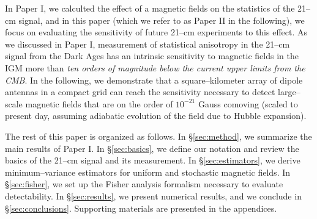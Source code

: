 In Paper I, we calculted the effect of a magnetic fields on the statistics of the 21--cm signal, and in this paper (which we refer to as Paper II in the following), we focus on evaluating the sensitivity of future 21--cm experiments to this effect. As we discussed in Paper I, measurement of statistical anisotropy in the 21--cm signal from the Dark Ages has an intrinsic sensitivity to magnetic fields in the IGM more than \textit{ten orders of magnitude below the current upper limits from the CMB}. In the following, we demonstrate that a square--kilometer array of dipole antennas in a compact grid can reach the sensitivity necessary to detect large--scale magnetic fields that are on the order of $10^{-21}$ Gauss comoving (scaled to present day, assuming adiabatic evolution of the field due to Hubble expansion). 

The rest of this paper is organized as follows. In \S\ref{sec:method}, we summarize the main results of Paper I. In \S\ref{sec:basics}, we define our notation and review the basics of the 21--cm signal and its measurement. In \S\ref{sec:estimators}, we derive minimum--variance estimators for uniform and stochastic magnetic fields. In \S\ref{sec:fisher}, we set up the Fisher analysis formalism necessary to evaluate detectability. In \S\ref{sec:results}, we present numerical results, and we conclude in \S\ref{sec:conclusions}. Supporting materials are presented in the appendices.
